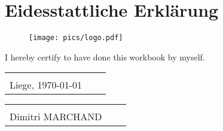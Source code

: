 \chapter*{Eidesstattliche Erklärung}

\begin{figure}[t!]
    \raggedleft
    \texttt{[image: pics/logo.pdf]}
\end{figure}

\thispagestyle{empty} %

I hereby certify to have done this workbook by myself.


\vspace{1,5 cm} 
\begin{tabular}{p{7cm}p{.5cm}l}
\dotfill \\ 
Liege, \today
\end{tabular}%
\hfill 
\begin{tabular}{p{7cm}p{.5cm}l}
\dotfill \\ 
Dimitri MARCHAND
\end{tabular}%